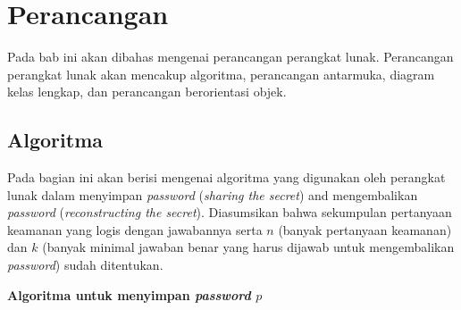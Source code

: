 \chapter{Perancangan}
\label{chap:perancangan}

Pada bab ini akan dibahas mengenai perancangan perangkat lunak. Perancangan perangkat lunak akan mencakup algoritma, perancangan antarmuka, diagram kelas lengkap, dan perancangan berorientasi objek.

\section{Algoritma}

Pada bagian ini akan berisi mengenai algoritma yang digunakan oleh perangkat lunak dalam menyimpan \textit{password} (\textit{sharing the secret}) and mengembalikan \textit{password} (\textit{reconstructing the secret}). Diasumsikan bahwa sekumpulan pertanyaan keamanan yang logis dengan jawabannya serta \begin{math}n\end{math} (banyak pertanyaan keamanan) dan \begin{math}k\end{math} (banyak minimal jawaban benar yang harus dijawab untuk mengembalikan \textit{password}) sudah ditentukan.

\begin{flushleft}
	\textbf{Algoritma untuk menyimpan \textit{password} \begin{math}p\end{math}}
\end{flushleft}


